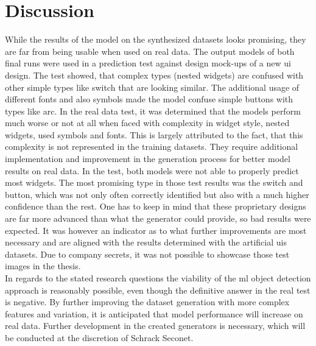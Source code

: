 \documentclass[Bachelor, BIC, english, fhCitStyle, IEEE]{BASE/twbook} %
\begin{document}
\chapter{Discussion}
While the results of the model on the synthesized datasets looks promising, they are far from being usable when used on real data. The output models of both final runs were used in a prediction test against design mock-ups of a new \ac{ui} design. The test showed, that complex types (nested widgets) are confused with other simple types like switch that are looking similar. The additional usage of different fonts and also symbols made the model confuse simple buttons with types like arc. In the real data test, it was determined that the models perform much worse or not at all when faced with complexity in widget style, nested widgets, used symbols and fonts. This is largely attributed to the fact, that this complexity is not represented in the training datasets. They require additional implementation and improvement in the generation process for better model results on real data. In the test, both models were not able to properly predict most widgets. The most promising type in those test results was the switch and button, which was not only often correctly identified but also with a much higher confidence than the rest. One has to keep in mind that these proprietary designs are far more advanced than what the generator could provide, so bad results were expected. It was however an indicator as to what further improvements are most necessary and are aligned with the results determined with the artificial \acp{ui} datasets. Due to company secrets, it was not possible to showcase those test images in the thesis.\\
In regards to the stated research questions the viability of the \ac{ml} object detection approach is reasonably possible, even though the definitive answer in the real test is negative. By further improving the dataset generation with more complex features and variation, it is anticipated that model performance will increase on real data. Further development in the created generators is necessary, which will be conducted at the discretion of Schrack Seconet.
\clearpage %

\printbibliography
\clearpage
\listoffigures %
\clearpage
\listoftables %
\listoflistings %
\clearpage
{}
{}
\end{document}
